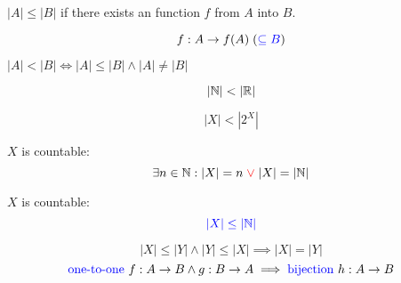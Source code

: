\begin{frame}{}
\end{frame}

\begin{frame}{}
  \begin{definition}[$|A| \le |B|$]
    $|A| \le |B|$ if there exists an  function $f$ from $A$ into $B$.
  \end{definition}

  \[
    f: A \to f(A) \; (\textcolor{blue}{\subseteq B})
  \]

  \pause
  \begin{definition}[$|A| < |B|$]
    $|A| < |B| \iff |A| \le |B| \land |A| \neq |B|$ 
  \end{definition}

  \pause
  \[
    |\mathbb{N}| < |\mathbb{R}|
  \]

  \[
    |X| < |2^{X}|
  \]
\end{frame}

\begin{frame}{}
  \begin{definition}
    $X$ is countable:
    \[
      \exists n \in \mathbb{N}: |X| = n \textcolor{red}{\;\lor\;} |X| = |\mathbb{N}|
    \]

    \pause
    $X$ is countable:
    \[
      \textcolor{blue}{|X| \le |\mathbb{N}|}
    \]
  \end{definition}
\end{frame}

\begin{frame}{}
  \centerline{\Large {}}

  \pause
  \vspace{0.30cm}
  \begin{theorem}
    \[
      |X| \le |Y| \land |Y| \le |X| \implies |X| = |Y|
    \]
    \pause
    \[
      \text{\textcolor{blue}{one-to-one} } f: A \to B \land g: B \to A \implies \text{\textcolor{blue}{bijection} } h: A \to B
    \]
  \end{theorem}

  \pause
  \begin{columns}
      \pause
  \end{columns}
\end{frame}
